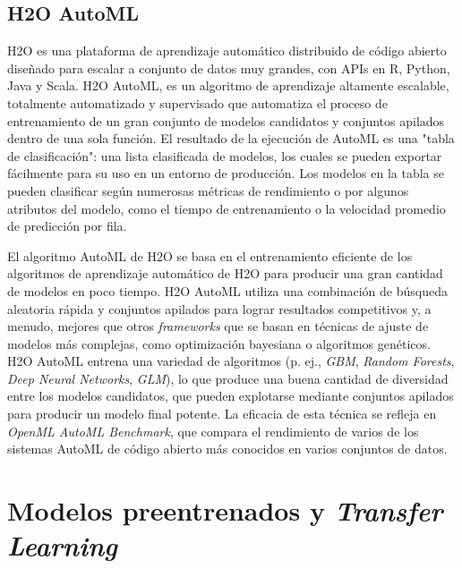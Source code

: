 \subsection{H2O AutoML}
H2O \parencite{73} es una plataforma de aprendizaje automático distribuido de código abierto diseñado para escalar a conjunto de datos muy grandes, con APIs en R, Python, Java y Scala. H2O AutoML, es un algoritmo de aprendizaje altamente escalable, totalmente automatizado y supervisado que automatiza el proceso de entrenamiento de un gran conjunto de modelos candidatos y conjuntos apilados dentro de una sola función. El resultado de la ejecución de AutoML es una "tabla de clasificación": una lista clasificada de modelos, los cuales se pueden exportar fácilmente para su uso en un entorno de producción. Los modelos en la tabla se pueden clasificar según numerosas métricas de rendimiento o por algunos atributos del modelo, como el tiempo de entrenamiento o la velocidad promedio de predicción por fila. 

El algoritmo AutoML de H2O se basa en el entrenamiento eficiente de los algoritmos de aprendizaje automático de H2O para producir una gran cantidad de modelos en poco tiempo. H2O AutoML utiliza una combinación de búsqueda aleatoria rápida y conjuntos apilados para lograr resultados competitivos y, a menudo, mejores que otros \textit{frameworks} que se basan en técnicas de ajuste de modelos más complejas, como optimización bayesiana o algoritmos genéticos. H2O AutoML entrena una variedad de algoritmos (p. ej., \textit{GBM}, \textit{Random Forests}, \textit{Deep Neural Networks}, \textit{GLM}), lo que produce una buena cantidad de diversidad entre los modelos candidatos, que pueden explotarse mediante conjuntos apilados para producir un modelo final potente. La eficacia de esta técnica se refleja en \textit{OpenML AutoML Benchmark}, que compara el rendimiento de varios de los sistemas AutoML de código abierto más conocidos en varios conjuntos de datos.

\section{Modelos preentrenados y \textit{Transfer Learning}}

